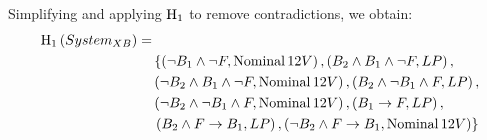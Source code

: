 Simplifying and applying $\healthiness[1]$ to remove contradictions, we obtain:
\[
\begin{split}
\healthinessfun[1]{System_{XB}} = &\\
  & \left\{ 
      \left(\lnot B_1 \land \lnot F, \Nominal{12V}\right), 
      \left(B_2 \land B_1 \land \lnot F, LP\right),\right.\\
  &   \left(\lnot B_2 \land B_1 \land \lnot F, \Nominal{12V}\right), 
      \left(B_2 \land \lnot B_1 \land F, LP\right), \\
  &   \left(\lnot B_2 \land \lnot B_1 \land F, \Nominal{12V}\right),
      \left(\xbefore{B_1}{F}, LP\right), \\
  &   \left.\left(B_2 \land \xbefore{F}{B_1}, LP\right), 
      \left(\lnot B_2 \land \xbefore{F}{B_1}, \Nominal{12V}\right) \right\}
\end{split}
\]

